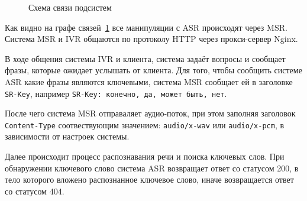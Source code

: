 \begin{figure}[h!]
    \centering
    \caption{Схема связи подсистем}
    \label{fig:schema}
\end{figure}

Как видно на графе связей~\ref{fig:schema} все манипуляции с ASR происходят через
MSR. Система MSR и IVR общаются по протоколу HTTP через прокси-сервер Nginx.

В ходе общения системы IVR и клиента, система задаёт вопросы и сообщает фразы,
которые ожидает услышать от клиента. Для того, чтобы сообщить системе ASR какие
фразы являются ключевыми, система MSR сообщает ей в заголовке \texttt{SR-Key},
например \texttt{SR-Key: конечно, да, может быть, нет}.

После чего система MSR отправаляет аудио-поток, при этом заполняя заголовок
\texttt{Content-Type} соотвествующим значением: \texttt{audio/x-wav} или
\texttt{audio/x-pcm}, в зависимости от настроек системы.

Далее происходит процесс распознавания речи и поиска ключевых слов. При обнаружении
ключевого слово система ASR возвращает ответ со статусом 200, в тело которого
вложено распознанное ключевое слово, иначе возвращается ответ со статусом 404.
